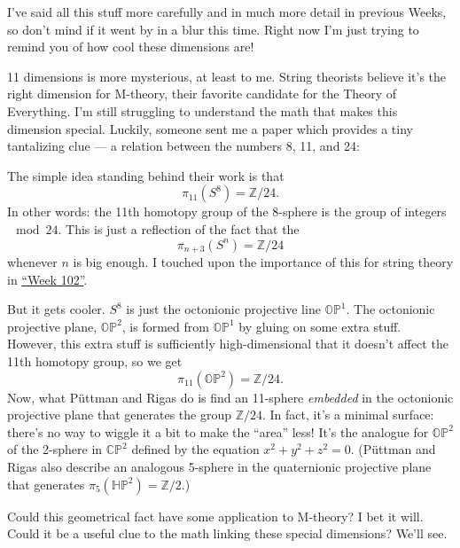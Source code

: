 \documentclass{article}
\def\tightlist{}
\renewcommand{\texttt}[1]{%
  \begingroup
  \ttfamily
  \begingroup\lccode`~=`/\lowercase{\endgroup\def~}{/\discretionary{}{}{}}%
  \begingroup\lccode`~=`[\lowercase{\endgroup\def~}{[\discretionary{}{}{}}%
  \begingroup\lccode`~=`.\lowercase{\endgroup\def~}{.\discretionary{}{}{}}%
  \catcode`/=\active\catcode`[=\active\catcode`.=\active
  \scantokens{#1\noexpand}%
  \endgroup
}
\begin{document}
I've said all this stuff more carefully and in much more detail in
previous Weeks, so don't mind if it went by in a blur this time. Right
now I'm just trying to remind you of how cool these dimensions are!

11 dimensions is more mysterious, at least to me. String theorists
believe it's the right dimension for M-theory, their favorite candidate
for the Theory of Everything. I'm still struggling to understand the
math that makes this dimension special. Luckily, someone sent me a paper
which provides a tiny tantalizing clue --- a relation between the
numbers 8, 11, and 24:


The simple idea standing behind their work is that
\[\pi_{11}(S^8) = \mathbb{Z}/24.\] In other words: the 11th homotopy
group of the 8-sphere is the group of integers \(\mod 24\). This is just
a reflection of the fact that the \[\pi_{n+3}(S^n) = \mathbb{Z}/24\]
whenever \(n\) is big enough. I touched upon the importance of this for
string theory in \protect\hyperlink{week102}{``Week 102''}.

But it gets cooler. \(S^8\) is just the octonionic projective line
\(\mathbb{OP}^1\). The octonionic projective plane, \(\mathbb{OP}^2\),
is formed from \(\mathbb{OP}^1\) by gluing on some extra stuff. However,
this extra stuff is sufficiently high-dimensional that it doesn't affect
the 11th homotopy group, so we get
\[\pi_{11}(\mathbb{OP}^2) = \mathbb{Z}/24.\] Now, what Püttman and Rigas
do is find an 11-sphere \emph{embedded} in the octonionic projective
plane that generates the group \(\mathbb{Z}/24\). In fact, it's a
minimal surface: there's no way to wiggle it a bit to make the ``area''
less! It's the analogue for \(\mathbb{OP}^2\) of the 2-sphere in
\(\mathbb{CP}^2\) defined by the equation \(x^2 + y^2 + z^2 = 0\).
(Püttman and Rigas also describe an analogous 5-sphere in the
quaternionic projective plane that generates
\(\pi_5(\mathbb{HP}^2) = \mathbb{Z}/2\).)

Could this geometrical fact have some application to M-theory? I bet it
will. Could it be a useful clue to the math linking these special
dimensions? We'll see.
\end{document}
